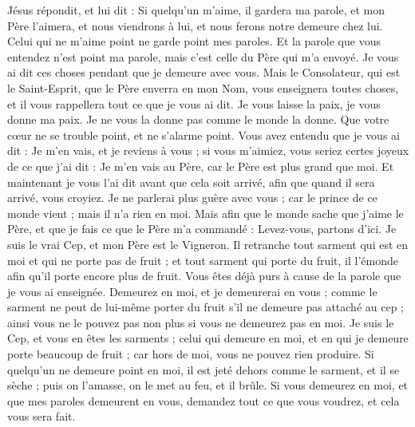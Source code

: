 \begin{multicols}{2}
Jésus répondit, et lui dit : Si quelqu'un m'aime, il gardera ma parole, et mon Père l'aimera, et nous viendrons à lui, et nous ferons notre demeure chez lui.
Celui qui ne m'aime point ne garde point mes paroles. Et la parole que vous entendez n'est point ma parole, mais c'est celle du Père qui m'a envoyé.
Je vous ai dit ces choses pendant que je demeure avec vous.
Mais le Consolateur, qui est le Saint-Esprit, que le Père enverra en mon Nom, vous enseignera toutes choses, et il vous rappellera tout ce que je vous ai dit.
Je vous laisse la paix, je vous donne ma paix. Je ne vous la donne pas comme le monde la donne. Que votre cœur ne se trouble point, et ne s'alarme point.
Vous avez entendu que je vous ai dit : Je m'en vais, et je reviens à vous ; si vous m'aimiez, vous seriez certes joyeux de ce que j'ai dit : Je m'en vais au Père, car le Père est plus grand que moi.
Et maintenant je vous l'ai dit avant que cela soit arrivé, afin que quand il sera arrivé, vous croyiez.
Je ne parlerai plus guère avec vous ; car le prince de ce monde vient ; mais il n'a rien en moi.
Mais afin que le monde sache que j'aime le Père, et que je fais ce que le Père m'a commandé : Levez-vous, partons d'ici.
\VerseOne{}Je suis le vrai Cep, et mon Père est le Vigneron.
Il retranche tout sarment qui est en moi et qui ne porte pas de fruit ; et tout sarment qui porte du fruit, il l'émonde afin qu'il porte encore plus de fruit.
Vous êtes déjà purs à cause de la parole que je vous ai enseignée.
Demeurez en moi, et je demeurerai en vous ; comme le sarment ne peut de lui-même porter du fruit s'il ne demeure pas attaché au cep ; ainsi vous ne le pouvez pas non plus si vous ne demeurez pas en moi.
Je suis le Cep, et vous en êtes les sarments ; celui qui demeure en moi, et en qui je demeure porte beaucoup de fruit ; car hors de moi, vous ne pouvez rien produire.
Si quelqu'un ne demeure point en moi, il est jeté dehors comme le sarment, et il se sèche ; puis on l'amasse, on le met au feu, et il brûle.
Si vous demeurez en moi, et que mes paroles demeurent en vous, demandez tout ce que vous voudrez, et cela vous sera fait.

\end{multicols}
